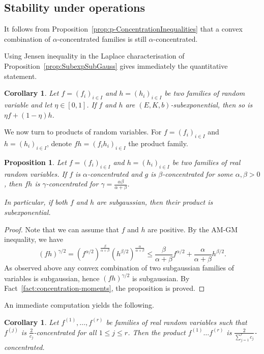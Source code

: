 \documentclass[11pt,leqno]{article}
\theoremstyle{plain}
\newtheorem{corollary}[theorem]{Corollary}
\newtheorem{proposition}[theorem]{Proposition}
\theoremstyle{definition}
\theoremstyle{remark}
\numberwithin{equation}{section}
\begin{document}
\subsection{Stability under operations}

It follows from Proposition~\ref{prop:p-ConcentrationInequalities} that a convex combination of $\alpha$-concentrated families is still $\alpha$-concentrated.

Using Jensen inequality in the Laplace characterisation of Proposition~\ref{prop:SubexpSubGauss} gives immediately the quantitative statement.


\begin{corollary}\label{cor:convexSubExp} 
Let $f=(f_{i})_{i\in I}$ and $h=(h_{i})_{i\in I}$ be two families
of random variable and let $\eta\in[0,1]$. If $f$ and $h$ are $(E,K,b)$-subexponential,
then so is $\eta f+(1-\eta)h$.
\end{corollary}

 We now turn to products of random variables. 
For $f=(f_{i})_{i\in I}$ and $h=(h_{i})_{i\in I}$,  denote
 $fh=(f_{i}h_{i})_{i\in I}$ the product family.


\begin{proposition}\label{prop:products} Let $f=(f_{i})_{i\in I}$
and $h=(h_{i})_{i\in I}$ be two families of real random variables.
If $f$ is $\alpha$-concentrated and $g$ is $\beta$-concentrated
for some $\alpha,\beta>0$, then $fh$ is $\gamma$-concentrated for
$\gamma=\frac{\alpha\beta}{\alpha+\beta}$. 

In particular, if both
$f$ and $h$ are subgaussian, then their product is subexponential.
\end{proposition} 
\begin{proof}
Note that we can assume that $f$ and $h$ are positive. By the AM-GM
inequality, we have 
\[
(fh)^{\gamma/2}=(f^{\alpha/2})^{\frac{\beta}{\alpha+\beta}}(h^{\beta/2})^{\frac{\alpha}{\alpha+\beta}}\leq\frac{\beta}{\alpha+\beta}f^{\alpha/2}+\frac{\alpha}{\alpha+\beta}h^{\beta/2}.
\]
As observed above any convex combination of two subgaussian
families of variables is subgaussian, hence $(fh)^{\gamma/2}$ is
subgaussian. By Fact~\ref{fact:concentration-moments}, the proposition is proved. 
\end{proof}

An immediate computation yields the following.
\begin{corollary}\label{cor:2/c}
Let $f^{(1)},\dots,f^{(r)}$ be families of real random variables such that $f^{(j)}$ is $\frac{2}{c_j}$-concentrated for all $1 \le j \le r$. Then the product $f^{(1)}\dots f^{(r)}$  is $\frac{2}{\sum_{j=1}^r c_j}$-concentrated.
\end{corollary}
\end{document}
